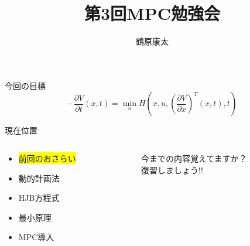 \documentclass[dvipdfmx,12pt]{beamer}
\title{第3回MPC勉強会}
\author{鶴原康太}
\begin{document}
    \frame{\maketitle}

    \begin{frame}{今回の目標}
        \begin{equation*}
            -\frac{\partial V}{\partial t}\left(x,t\right) = \min _u H\left(x, u, \left( \frac{\partial V}{\partial x} \right)^T\left(x, t\right), t \right)
        \end{equation*}
    \end{frame}

    \begin{frame}{現在位置}
        \begin{columns}
            \begin{column}{.5\textwidth}
                \begin{itemize}
                    \item \colorbox{yellow}{前回のおさらい}
                    \item 動的計画法
                    \item HJB方程式
                    \item 最小原理
                    \item MPC導入
                \end{itemize}
            \end{column}
    
            \begin{column}{.5\textwidth}
                今までの内容覚えてますか？\\
                復習しましょう!!
            \end{column}
        \end{columns}
    \end{frame}
\end{document}
